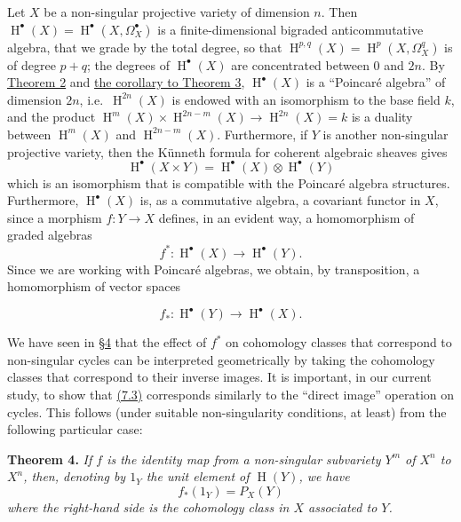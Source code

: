 \documentclass{article}
\newenvironment{itenv}[1]
  {\phantomsection\par\smallskip\noindent\textbf{#1.}\itshape}
  {\par\smallskip}
\newenvironment{eqenv}
  {}
  {}
\newcommand{\oldpage}[1]{\marginpar{\footnotesize$\Big\vert$ \textit{p.~#1}}}
\theoremstyle{definition}
\theoremstyle{definition}
\theoremstyle{definition}
\theoremstyle{definition}
\theoremstyle{remark}
\begin{document}
Let \(X\) be a non-singular projective variety of dimension \(n\).
Then \(\operatorname{H}^\bullet(X)=\operatorname{H}^\bullet(X,\Omega_X^\bullet)\) is a finite-dimensional bigraded anticommutative algebra, that we grade by the total degree, so that \(\operatorname{H}^{p,q}(X)=\operatorname{H}^p(X,\Omega_X^q)\) is of degree \(p+q\);
the degrees of \(\operatorname{H}^\bullet(X)\) are concentrated between \(0\) and \(2n\).
By \protect\hyperlink{fga-1-theorem-2}{Theorem 2} and \protect\hyperlink{fga-1-theorem-3-corollary}{the corollary to Theorem 3}, \(\operatorname{H}^\bullet(X)\) is a ``Poincaré algebra'' of dimension \(2n\), i.e.~\(\operatorname{H}^{2n}(X)\) is endowed with an isomorphism to the base field \(k\), and the product \(\operatorname{H}^m(X)\times\operatorname{H}^{2n-m}(X)\to\operatorname{H}^{2n}(X)=k\) is a duality between \(\operatorname{H}^m(X)\) and \(\operatorname{H}^{2n-m}(X)\).
Furthermore, if \(Y\) is another non-singular projective variety, then the Künneth formula for coherent algebraic sheaves gives
\[
  \operatorname{H}^\bullet(X\times Y) = \operatorname{H}^\bullet(X)\otimes\operatorname{H}^\bullet(Y)
\tag{7.1}
\]
which is an isomorphism that is compatible with the Poincaré algebra structures.
Furthermore, \(\operatorname{H}^\bullet(X)\) is, as a commutative algebra, a covariant functor in \(X\), since a morphism \(f\colon Y\to X\) defines, in an evident way, a homomorphism of graded algebras
\[
  f^*\colon \operatorname{H}^\bullet(X)\to\operatorname{H}^\bullet(Y).
\tag{7.2}
\]
\oldpage{149-20}Since we are working with Poincaré algebras, we obtain, by transposition, a homomorphism of vector spaces

\leavevmode{}%
\begin{eqenv}
\[
  f_*\colon \operatorname{H}^\bullet(Y)\to\operatorname{H}^\bullet(X).
\tag{7.3}
\]

\end{eqenv}

We have seen in \protect\hyperlink{fga-1-section-4}{§4} that the effect of \(f^*\) on cohomology classes that correspond to non-singular cycles can be interpreted geometrically by taking the cohomology classes that correspond to their inverse images.
It is important, in our current study, to show that \protect\hyperlink{fga-1-equation-7.3}{(7.3)} corresponds similarly to the ``direct image'' operation on cycles.
This follows (under suitable non-singularity conditions, at least) from the following particular case:

\leavevmode{}%
\begin{itenv}{Theorem 4}
If \(f\) is the identity map from a non-singular subvariety \(Y^m\) of \(X^n\) to \(X^n\), then, denoting by \(1_Y\) the unit element of \(\operatorname{H}(Y)\), we have
\[
  f_*(1_Y) = P_X(Y)
\tag{7.4}
\]
where the right-hand side is the cohomology class in \(X\) associated to \(Y\).

\end{itenv}
\end{document}
